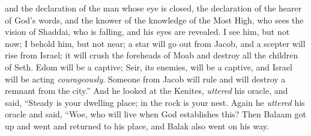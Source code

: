 \begin{biblechapter}
and the declaration of the man whose eye is closed,
\verse the declaration of the hearer of God’s words, 
and the knower of the knowledge of the Most High, 
who sees the vision of Shaddai, 
who is falling, and his eyes are revealed.
\verse I see him, but not now; 
I behold him, but not near; 
a star will go out from Jacob, 
and a scepter will rise from Israel; 
it will crush the foreheads of Moab 
and destroy all the children of Seth.
\verse Edom will be a captive; 
Seir, its enemies, will be a captive, 
and Israel will be acting \textit{courageously}.
\verse Someone from Jacob will rule 
and will destroy a remnant from the city.”
\verse And he looked at the Kenites, \textit{uttered} his oracle, and said,
\verse “Steady is your dwelling place; 
in the rock is your nest.
\verse Again he \textit{uttered} his oracle and said,
\verse “Woe, who will live when God establishes this?
\verse Then Balaam got up and went and returned to his place, and Balak also went on his way.
\end{biblechapter}

